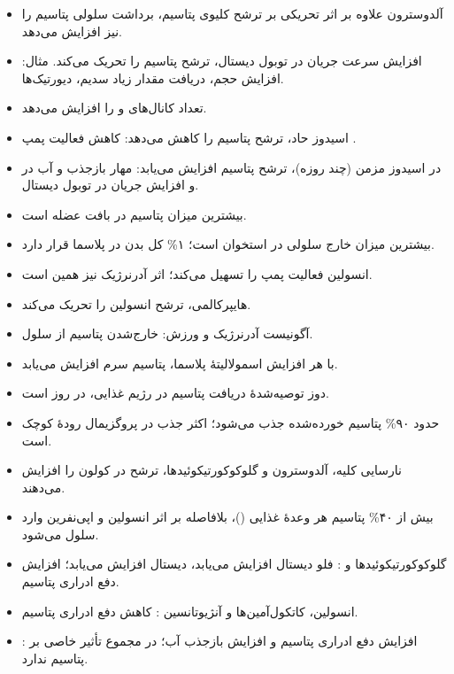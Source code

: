 \documentclass[11pt,a4paper]{article}
\begin{document}
\begin{itemize}
\item آلدوسترون علاوه بر اثر تحریکی بر ترشح کلیوی پتاسیم، برداشت سلولی پتاسیم را نیز افزایش می‌دهد.
\item افزایش سرعت جریان در توبول دیستال، ترشح پتاسیم را تحریک می‌کند. مثال: افزایش حجم، دریافت مقدار زیاد سدیم، دیورتیک‌ها.
\item تعداد کانال‌های  و  را افزایش می‌دهد.
\item اسیدوز حاد، ترشح پتاسیم را کاهش می‌دهد: کاهش فعالیت پمپ .
\item در اسیدوز مزمن (چند روزه)، ترشح پتاسیم افزایش می‌یابد: مهار بازجذب  و آب در  و افزایش جریان در توبول دیستال.
\item بیشترین میزان پتاسیم در بافت عضله است.
\item بیشترین میزان  خارج سلولی در استخوان است؛ ۱\% کل  بدن در پلاسما قرار دارد.
\item انسولین فعالیت پمپ  را تسهیل می‌کند؛ اثر \KDen{$\beta$} آدرنرژیک نیز همین است.
\item هایپرکالمی، ترشح انسولین را تحریک می‌کند.
\item آگونیست \KDen{$\alpha$} آدرنرژیک و ورزش: خارج‌شدن پتاسیم از سلول.
\item با هر  افزایش اسمولالیتهٔ پلاسما، پتاسیم سرم  افزایش می‌یابد.
\item دوز توصیه‌شدهٔ دریافت پتاسیم در رژیم غذایی،  در روز است.
\item حدود ۹۰\% پتاسیم خورده‌شده جذب می‌شود؛ اکثر جذب در پروگزیمال رودهٔ کوچک است.
\item نارسایی کلیه، آلدوسترون و گلوکوکورتیکوئیدها، ترشح  در کولون را افزایش می‌دهند.
\item بیش از ۴۰\% پتاسیم هر وعدهٔ غذایی ()، بلافاصله بر اثر انسولین و اپی‌نفرین وارد سلول می‌شود.
\end{itemize}

\begin{itemize}
\item گلوکوکورتیکوئیدها و : فلو دیستال افزایش می‌یابد،  دیستال افزایش می‌یابد؛ افزایش دفع ادراری پتاسیم.
\item انسولین، کاتکول‌آمین‌ها و آنژیوتانسین : کاهش دفع ادراری پتاسیم.
\item {}: افزایش دفع ادراری پتاسیم و افزایش بازجذب آب؛ در مجموع تأثیر خاصی بر پتاسیم ندارد.
\end{itemize}
\end{document}
